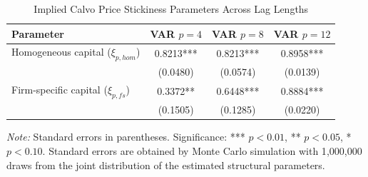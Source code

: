 \begin{table}[htpb]
    \centering
    \small
    \renewcommand{\arraystretch}{1.2}
    \caption{Implied Calvo Price Stickiness Parameters Across Lag Lengths}
    \label{tab:calvo_price_stickiness_4_8_12}
    \begin{tabular}{lccc}
    \toprule
    \textbf{Parameter} & \textbf{VAR $p=4$} & \textbf{VAR $p=8$} & \textbf{VAR $p=12$} \\
    \midrule
    Homogeneous capital ($\xi_{p, hom}$) & 0.8213*** & 0.8213*** & 0.8958*** \\
    & (0.0480) & (0.0574) & (0.0139) \\
    Firm-specific capital ($\xi_{p, fs}$) & 0.3372** & 0.6448*** & 0.8884*** \\
    & (0.1505) & (0.1285) & (0.0220) \\
    \bottomrule
    \end{tabular}

    \vspace{0.2cm}
    \raggedright
    \scriptsize{\textit{Note:} Standard errors in parentheses. Significance: *** $p<0.01$, ** $p<0.05$, * $p<0.10$. Standard errors are obtained by Monte Carlo simulation with 1{,}000{,}000 draws from the joint distribution of the estimated structural parameters.}
\end{table}
